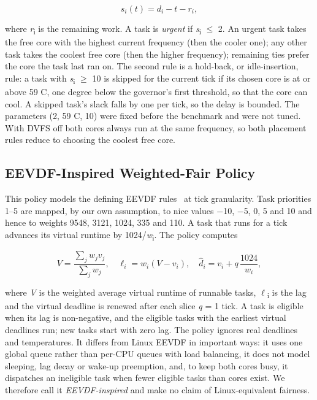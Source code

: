 \documentclass[conference]{IEEEtran}
\begin{document}
\begin{equation}
s_i(t) = d_i - t - r_i,
\label{eq:slack}
\end{equation}

where \emph{r}\textsubscript{i} is the remaining work. A task is \emph{urgent} if \emph{s}\textsubscript{i} $\leq$ 2. An urgent task takes the free core with the highest current frequency (then the cooler one); any other task takes the coolest free core (then the higher frequency); remaining ties prefer the core the task last ran on. The second rule is a hold-back, or idle-insertion, rule: a task with \emph{s}\textsubscript{i} $\geq$ 10 is skipped for the current tick if its chosen core is at or above 59 \textdegree{}C, one degree below the governor's first threshold, so that the core can cool. A skipped task's slack falls by one per tick, so the delay is bounded. The parameters (2, 59 \textdegree{}C, 10) were fixed before the benchmark and were not tuned. With DVFS off both cores always run at the same frequency, so both placement rules reduce to choosing the coolest free core.

\subsection{EEVDF-Inspired Weighted-Fair Policy}\label{sec:pol-eevdf}
This policy models the defining EEVDF rules~\cite{stoica1995} at tick granularity. Task priorities 1--5 are mapped, by our own assumption, to nice values $-$10, $-$5, 0, 5 and 10 and hence to weights 9548, 3121, 1024, 335 and 110. A task that runs for a tick advances its virtual runtime by 1024/\emph{w}\textsubscript{i}. The policy computes

\begin{equation}
V = \frac{\sum_j w_j v_j}{\sum_j w_j}, \quad \ell_i = w_i (V - v_i), \quad \hat{d}_i = v_i + q\,\frac{1024}{w_i},
\label{eq:eevdf}
\end{equation}

where \emph{V} is the weighted average virtual runtime of runnable tasks, $\ell$\textsubscript{i} is the lag and the virtual deadline is renewed after each slice \emph{q} = 1 tick. A task is eligible when its lag is non-negative, and the eligible tasks with the earliest virtual deadlines run; new tasks start with zero lag. The policy ignores real deadlines and temperatures. It differs from Linux EEVDF in important ways: it uses one global queue rather than per-CPU queues with load balancing, it does not model sleeping, lag decay or wake-up preemption, and, to keep both cores busy, it dispatches an ineligible task when fewer eligible tasks than cores exist. We therefore call it \emph{EEVDF-inspired} and make no claim of Linux-equivalent fairness.
\end{document}
